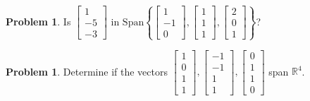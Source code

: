 \documentclass[10pt]{article}
\theoremstyle{definition}
\newtheorem{problem}[theorem]{Problem}
\newcommand{\1}[1]{\textbf{1}_{\left[#1\right]}} %
\def\R{\mathbb{R}} %
\begin{document}
\begin{problem}
  Is $
  \begin{bmatrix}
    1\\-5\\-3
  \end{bmatrix}
  $ in $\mathrm{Span}\left\{
    \begin{bmatrix}
      1\\-1\\0
    \end{bmatrix},
    \begin{bmatrix}
      1\\1\\1
    \end{bmatrix},
    \begin{bmatrix}
      2\\0\\1
    \end{bmatrix}
  \right\}$?
\end{problem}

\begin{problem}
  Determine if the vectors $
  \begin{bmatrix}
    1\\0\\1\\1
  \end{bmatrix},
  \begin{bmatrix}
    -1\\-1\\1\\1
  \end{bmatrix},
  \begin{bmatrix}
    0\\1\\1\\0
  \end{bmatrix}
  $
  span $\R^{4}$.
\end{problem}
\end{document}
